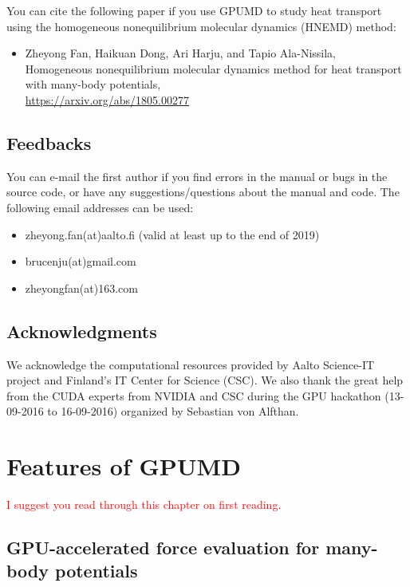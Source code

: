 \documentclass[12pt,a4paper]{report}
\begin{document}
You can cite the following paper if you use GPUMD to study heat transport using the homogeneous nonequilibrium molecular dynamics (HNEMD) method:
\begin{itemize}
\item 
Zheyong Fan, Haikuan Dong, Ari Harju, and Tapio Ala-Nissila, \\
Homogeneous nonequilibrium molecular dynamics method for heat transport with many-body potentials, \\
\url{https://arxiv.org/abs/1805.00277}
\end{itemize}


\section{Feedbacks}

You can e-mail the first author if you find errors in the manual or bugs in the source code, or have any suggestions/questions about the manual and code. The following email addresses can be used:
\begin{itemize}
\item zheyong.fan(at)aalto.fi (valid at least up to the end of 2019)
\item brucenju(at)gmail.com
\item zheyongfan(at)163.com
\end{itemize}


\section{Acknowledgments}
We acknowledge the computational resources provided by Aalto Science-IT project and Finland's IT Center for Science (CSC). We also thank the great help from the CUDA experts from NVIDIA and CSC during the GPU hackathon (13-09-2016 to 16-09-2016) organized by Sebastian von Alfthan.




\chapter{Features of GPUMD\label{chapter:features}}

\textcolor{red}{I suggest you read through this chapter on first reading.}



\section{GPU-accelerated force evaluation for many-body potentials}
\end{document}
